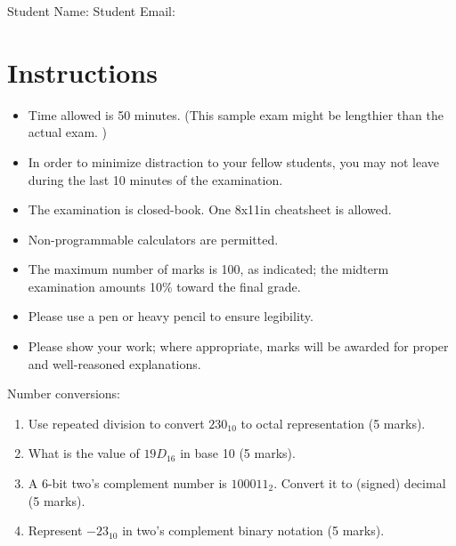 
\maketitle

Student Name: \hfill Student Email: \hspace{10em}
\section{Instructions}
\begin{itemize}
  \item Time allowed is 50 minutes. (This sample exam might be lengthier than the actual exam. )
  \item In order to minimize distraction to your fellow students, you may not leave
  during the last 10 minutes of the examination.
  \item The examination is closed-book. One 8x11in cheatsheet is allowed.
  \item Non-programmable calculators are permitted.
  \item The maximum number of marks is 100, as indicated; the midterm examination
  amounts 10\% toward the final grade.
  \item Please use a pen or heavy pencil to ensure legibility.
  \item Please show your work; where appropriate, marks will be awarded for proper and well-reasoned explanations.
\end{itemize}

\begin{prob}
  Number conversions:
  \begin{enumerate}
    \item Use repeated division to convert $230_{10}$ to octal representation (5 marks).
    \item What is the value of $19D_{16}$ in base 10 (5 marks).
    \item A 6-bit two's complement number is $100011_{2}$. Convert it to (signed) decimal (5 marks).
    \item Represent $-23_{10}$ in two's complement binary notation (5 marks).
  \end{enumerate}
\end{prob}

